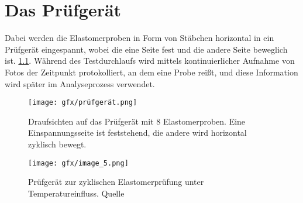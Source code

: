 \chapter{Das Prüfgerät}
Dabei werden die Elastomerproben in Form von Stäbchen horizontal in ein Prüfgerät eingespannt, wobei die eine Seite fest und die andere Seite beweglich ist. \ref{fig:part01:prüfgerät}. Während des Testdurchlaufs wird  mittels kontinuierlicher Aufnahme von Fotos der Zeitpunkt protokolliert, an dem eine Probe reißt, und diese Information wird später im Analyseprozess verwendet. 

\begin{figure}[htbp]
 \centering
 \texttt{[image: gfx/prüfgerät.png]}
 \caption{Draufsichten auf das Prüfgerät mit 8 Elastomerproben. Eine Einspannungsseite ist feststehend, die andere wird horizontal zyklisch bewegt.}
 \label{fig:part01:prüfgerät}
\end{figure}

\begin{figure}[htbp]
 \centering
 \texttt{[image: gfx/image\_5.png]}
 \caption{Prüfgerät zur zyklischen Elastomerprüfung unter Temperatureinfluss. Quelle \cite{zyklischePrüfung}}
 \label{fig:part01:prüfgerät_2}
\end{figure}